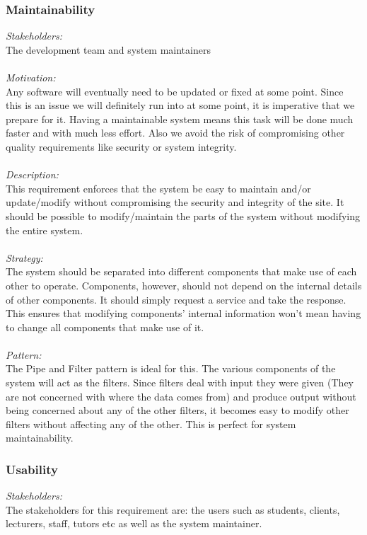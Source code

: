 \documentclass[a4paper,12pt]{report}
\begin{document}
		\subsubsection{Maintainability}
		\emph{Stakeholders: }\\ The development team and system maintainers \\ 
		\\\emph{Motivation: }\\ Any software will eventually need to be updated or fixed at some point. Since this is an issue we will definitely run into at some point, it is imperative that we prepare for it. Having a maintainable system means this task will be done much faster and with much less effort. Also we avoid the risk of compromising other quality requirements like security or system integrity. \\ 
		\\\emph{Description: }\\ This requirement enforces that the system be easy to maintain and/or update/modify without compromising the security and integrity of the site. It should be possible to modify/maintain the parts of the system without modifying the entire system. \\ 
		\\\emph{Strategy: }\\ The system should be separated into different components that make use of each other to operate. Components, however, should not depend on the internal details of other components. It should simply request a service and take the response. This ensures that modifying components’ internal information won’t mean having to change all components that make use of it. \\
		\\\emph{Pattern: }\\ The Pipe and Filter pattern is ideal for this. The various components of the system will act as the filters. Since filters deal with input they were given (They are not concerned with where the data comes from) and produce output without being concerned about any of the other filters, it becomes easy to modify other filters without affecting any of the other. This is perfect for system maintainability.
			
		\subsubsection{Usability}
		\emph{Stakeholders: }\\ The stakeholders for this requirement are: the users such as students, clients, lecturers, staff, tutors etc as well as the system maintainer.\\
		
\end{document}
